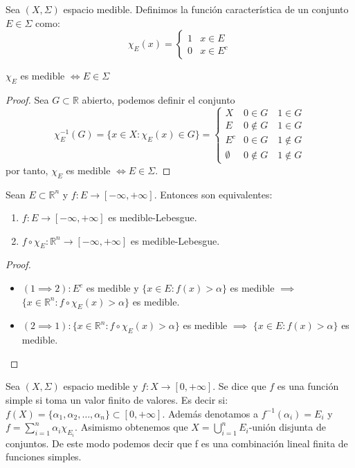 \begin{definición}
Sea $(X, \Sigma)$ espacio medible. Definimos la función característica de un conjunto $E \in \Sigma$ como: \[\chi_E(x) = \begin{cases} 1 & x \in E \\ 0 & x \in E^c \end{cases}\]
\end{definición}
\begin{observación}
$\chi_E$ es medible $\iff E \in \Sigma$
\end{observación}
\begin{proof}
    Sea $G \subset \mathbb{R}$ abierto, podemos definir el conjunto $$\chi_E^{-1}(G) = \{x \in X : \chi_E(x) \in G\} = \begin{cases} X & 0 \in G \quad 1\in G \\ E & 0 \not\in G \quad 1 \in G \\ E^c & 0 \in G \quad 1 \not\in G \\ \emptyset & 0 \not\in G \quad 1 \not\in G\end{cases}$$
    por tanto, $\chi_E$ es medible $\iff E \in \Sigma$.
\end{proof}
\begin{observación}
Sean $E \subset \mathbb{R}^{n}$ y $f: E \to [-\infty, +\infty]$. Entonces son equivalentes:
\vspace{-0.5em}
\begin{enumerate}
    \item $f: E \to [-\infty, +\infty]$ es medible-Lebesgue.
    \item $f \circ \chi_E: \mathbb{R}^n \to [-\infty, +\infty]$ es medible-Lebesgue.
\end{enumerate}
\end{observación}
\begin{proof}
    \leavevmode
    \begin{itemize}
        \item $(1 \implies 2): E^c$ es medible y $\{x \in E : f(x) > \alpha\}$ es medible $\implies$ $\{x \in \mathbb{R}^n : f \circ \chi_E(x) > \alpha\}$ es medible.
        \item $(2 \implies 1): \{x \in \mathbb{R}^n : f \circ \chi_E(x) > \alpha\}$ es medible $\implies$ $\{x \in E : f(x) > \alpha\}$ es medible.
    \end{itemize}
\end{proof}
\begin{definición}
Sea $(X, \Sigma)$ espacio medible y $f: X \to [0, +\infty]$. Se dice que $f$ es una función simple si toma un valor finito de valores. Es decir si:
$f(X) = \{\alpha_1, \alpha_2, \dots, \alpha_n\} \subset [0, +\infty]$.
Además denotamos a $f^{-1}(\alpha_i) = E_i$ y $f = \sum_{i = 1}^{n}\alpha_i\chi_{E_i}$. Asimismo obtenemos que $X = \bigcup_{i = 1}^{n}E_i$-unión disjunta de conjuntos.
De este modo podemos decir que f es una combinación lineal finita de funciones simples.
\end{definición}
